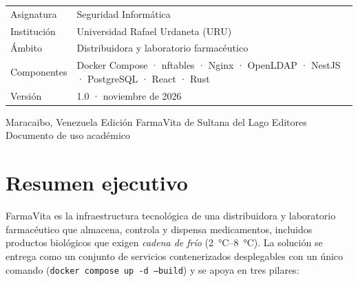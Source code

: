 \documentclass[11pt,a4paper,oneside]{report}
\newcommand{\cod}[1]{\texttt{\small #1}}
\begin{document}
\begin{titlepage}
\begin{flushleft}
\begin{minipage}{0.86\textwidth}
\begin{tabular}{@{}L{4.2cm}L{9cm}@{}}
\textcolor{fvGris}{Asignatura} & Seguridad Informática \\
\textcolor{fvGris}{Institución} & Universidad Rafael Urdaneta (URU) \\
\textcolor{fvGris}{Ámbito} & Distribuidora y laboratorio farmacéutico \\
\textcolor{fvGris}{Componentes} & Docker Compose · nftables · Nginx · OpenLDAP · NestJS · PostgreSQL · React · Rust \\
\textcolor{fvGris}{Versión} & 1.0 · noviembre de 2026 \\
\end{tabular}
\end{minipage}
\end{flushleft}

\vfill
\begin{center}
\sffamily\scriptsize\color{fvGris}
Maracaibo, Venezuela \textbullet{} Edición FarmaVita de Sultana del Lago Editores \textbullet{} Documento de uso académico
\end{center}
\end{titlepage}

\tableofcontents
\listoffigures
\listoftables
\clearpage
{}

\chapter*{Resumen ejecutivo}

FarmaVita es la infraestructura tecnológica de una distribuidora y laboratorio farmacéutico
que almacena, controla y dispensa medicamentos, incluidos productos biológicos que exigen
\emph{cadena de frío} (\SIrange{2}{8}{\celsius}). La solución se entrega como un conjunto de
servicios contenerizados desplegables con un único comando
(\cod{docker compose up -d --build}) y se apoya en tres pilares:
\end{document}
